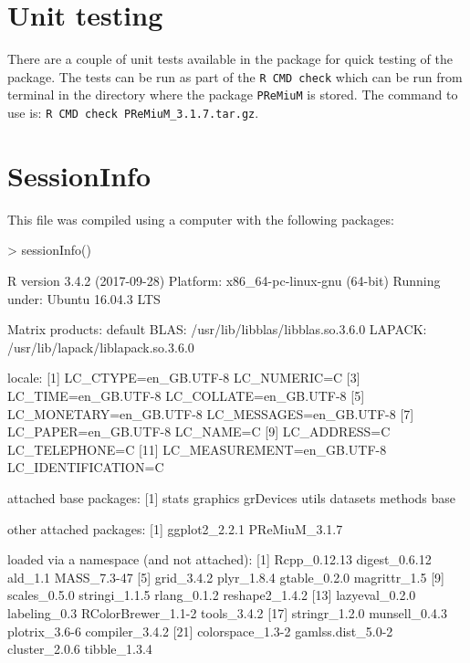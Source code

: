 \documentclass{article}
\begin{document}
\section{Unit testing}
There are a couple of unit tests available in the package for quick testing of the package. The tests can be run as part of the \texttt{R CMD check} which can be run from terminal in the directory where the package \verb|PReMiuM| is stored. The command to use is: \verb|R CMD check PReMiuM_3.1.7.tar.gz|.


\section{SessionInfo}

This file was compiled using a computer with the following packages: 

\begin{Schunk}
\begin{Sinput}
> sessionInfo()
\end{Sinput}
\begin{Soutput}
R version 3.4.2 (2017-09-28)
Platform: x86_64-pc-linux-gnu (64-bit)
Running under: Ubuntu 16.04.3 LTS

Matrix products: default
BLAS: /usr/lib/libblas/libblas.so.3.6.0
LAPACK: /usr/lib/lapack/liblapack.so.3.6.0

locale:
 [1] LC_CTYPE=en_GB.UTF-8       LC_NUMERIC=C              
 [3] LC_TIME=en_GB.UTF-8        LC_COLLATE=en_GB.UTF-8    
 [5] LC_MONETARY=en_GB.UTF-8    LC_MESSAGES=en_GB.UTF-8   
 [7] LC_PAPER=en_GB.UTF-8       LC_NAME=C                 
 [9] LC_ADDRESS=C               LC_TELEPHONE=C            
[11] LC_MEASUREMENT=en_GB.UTF-8 LC_IDENTIFICATION=C       

attached base packages:
[1] stats     graphics  grDevices utils     datasets  methods   base     

other attached packages:
[1] ggplot2_2.2.1 PReMiuM_3.1.7

loaded via a namespace (and not attached):
 [1] Rcpp_0.12.13       digest_0.6.12      ald_1.1            MASS_7.3-47       
 [5] grid_3.4.2         plyr_1.8.4         gtable_0.2.0       magrittr_1.5      
 [9] scales_0.5.0       stringi_1.1.5      rlang_0.1.2        reshape2_1.4.2    
[13] lazyeval_0.2.0     labeling_0.3       RColorBrewer_1.1-2 tools_3.4.2       
[17] stringr_1.2.0      munsell_0.4.3      plotrix_3.6-6      compiler_3.4.2    
[21] colorspace_1.3-2   gamlss.dist_5.0-2  cluster_2.0.6      tibble_1.3.4      
\end{Soutput}
\end{Schunk}



\end{document}
